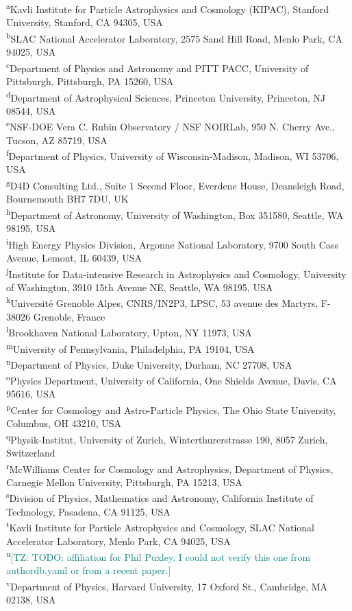 \documentclass[]{spie}
\providecommand{\supit}[1]{\textsuperscript{#1}}
\newcommand{\tianqing}[1]{\textcolor{teal}{[TZ: #1]}}
\begin{document}
{\footnotesize
\noindent\supit{a}Kavli Institute for Particle Astrophysics and Cosmology (KIPAC), Stanford University, Stanford, CA 94305, USA\\
\supit{b}SLAC National Accelerator Laboratory, 2575 Sand Hill Road, Menlo Park, CA 94025, USA\\
\supit{c}Department of Physics and Astronomy and PITT PACC, University of Pittsburgh, Pittsburgh, PA 15260, USA\\
\supit{d}Department of Astrophysical Sciences, Princeton University, Princeton, NJ 08544, USA\\
\supit{e}NSF-DOE Vera C. Rubin Observatory / NSF NOIRLab, 950 N. Cherry Ave., Tucson, AZ 85719, USA\\
\supit{f}Department of Physics, University of Wisconsin-Madison, Madison, WI 53706, USA\\
\supit{g}D4D Consulting Ltd., Suite 1 Second Floor, Everdene House, Deansleigh Road, Bournemouth BH7 7DU, UK\\
\supit{h}Department of Astronomy, University of Washington, Box 351580, Seattle, WA 98195, USA\\
\supit{i}High Energy Physics Division, Argonne National Laboratory, 9700 South Cass Avenue, Lemont, IL 60439, USA\\
\supit{j}Institute for Data-intensive Research in Astrophysics and Cosmology, University of Washington, 3910 15th Avenue NE, Seattle, WA 98195, USA\\
\supit{k}Universit\'{e} Grenoble Alpes, CNRS/IN2P3, LPSC, 53 avenue des Martyrs, F-38026 Grenoble, France\\
\supit{l}Brookhaven National Laboratory, Upton, NY 11973, USA\\
\supit{m}University of Pennsylvania, Philadelphia, PA 19104, USA\\
\supit{n}Department of Physics, Duke University, Durham, NC 27708, USA\\
\supit{o}Physics Department, University of California, One Shields Avenue, Davis, CA 95616, USA\\
\supit{p}Center for Cosmology and Astro-Particle Physics, The Ohio State University, Columbus, OH 43210, USA\\
\supit{q}Physik-Institut, University of Zurich, Winterthurerstrasse 190, 8057 Zurich, Switzerland\\
\supit{r}McWilliams Center for Cosmology and Astrophysics, Department of Physics, Carnegie Mellon University, Pittsburgh, PA 15213, USA\\
\supit{s}Division of Physics, Mathematics and Astronomy, California Institute of Technology, Pasadena, CA 91125, USA\\
\supit{t}Kavli Institute for Particle Astrophysics and Cosmology, SLAC National Accelerator Laboratory, Menlo Park, CA 94025, USA\\
\supit{u}\tianqing{TODO: affiliation for Phil Puxley. I could not verify this one from authordb.yaml or from a recent paper.}\\
\supit{v}Department of Physics, Harvard University, 17 Oxford St., Cambridge, MA 02138, USA\par
}
\end{document}
